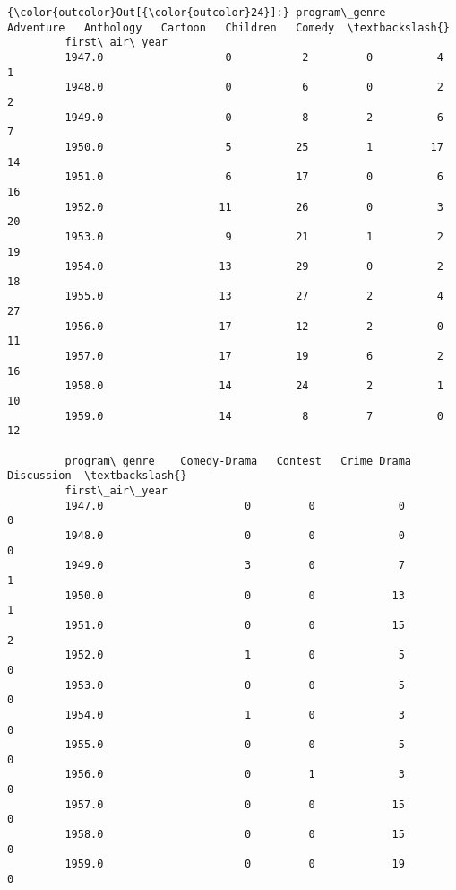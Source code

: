 \documentclass[11pt]{article}
\begin{document}
\begin{Verbatim}[commandchars=\\\{\}]
{\color{outcolor}Out[{\color{outcolor}24}]:} program\_genre    Adventure   Anthology   Cartoon   Children   Comedy  \textbackslash{}
         first\_air\_year                                                         
         1947.0                   0           2         0          4        1   
         1948.0                   0           6         0          2        2   
         1949.0                   0           8         2          6        7   
         1950.0                   5          25         1         17       14   
         1951.0                   6          17         0          6       16   
         1952.0                  11          26         0          3       20   
         1953.0                   9          21         1          2       19   
         1954.0                  13          29         0          2       18   
         1955.0                  13          27         2          4       27   
         1956.0                  17          12         2          0       11   
         1957.0                  17          19         6          2       16   
         1958.0                  14          24         2          1       10   
         1959.0                  14           8         7          0       12   
         
         program\_genre    Comedy-Drama   Contest   Crime Drama   Discussion  \textbackslash{}
         first\_air\_year                                                       
         1947.0                      0         0             0            0   
         1948.0                      0         0             0            0   
         1949.0                      3         0             7            1   
         1950.0                      0         0            13            1   
         1951.0                      0         0            15            2   
         1952.0                      1         0             5            0   
         1953.0                      0         0             5            0   
         1954.0                      1         0             3            0   
         1955.0                      0         0             5            0   
         1956.0                      0         1             3            0   
         1957.0                      0         0            15            0   
         1958.0                      0         0            15            0   
         1959.0                      0         0            19            0   
         

\end{Verbatim}
\end{document}
